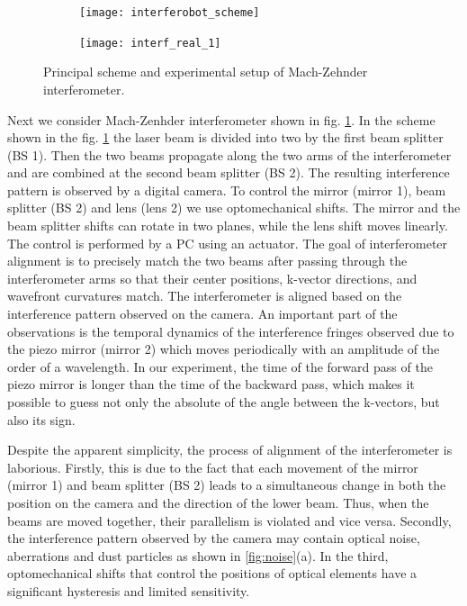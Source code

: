 \begin{figure}[ht]
    \centering
     \begin{subfigure}[b]{0.45\linewidth}
         \centering
         \texttt{[image: interferobot\_scheme]}
     \end{subfigure}
     \centering
     \begin{subfigure}[b]{0.45\linewidth}
         \centering
         \texttt{[image: interf\_real\_1]}
     \end{subfigure}
    \caption{
     Principal scheme and experimental setup of Mach-Zehnder interferometer.}
\label{fig:interf_scheme_1}
\end{figure}

Next we consider Mach-Zenhder interferometer shown in fig. \ref{fig:interf_scheme_1}. In the scheme shown in the fig. \ref{fig:interf_scheme_1} the laser beam is divided into two by the first beam splitter (BS 1). Then the two beams propagate along the two arms of the interferometer and are combined at the second beam splitter (BS 2). The resulting interference pattern is observed by a digital camera. To control the mirror (mirror 1), beam splitter (BS 2) and lens (lens 2) we use optomechanical shifts. The mirror and the beam splitter shifts can rotate in two planes, while the lens shift moves linearly. The control is performed by a PC using an actuator. The goal of interferometer alignment is to precisely match the two beams after passing through the interferometer arms so that their center positions, k-vector directions, and wavefront curvatures match. The interferometer is aligned based on the interference pattern observed on the camera. An important part of the observations is the temporal dynamics of the interference fringes observed due to the piezo mirror (mirror 2) which moves periodically with an amplitude of the order of a wavelength. In our experiment, the time of the forward pass of the piezo mirror is longer than the time of the backward pass, which makes it possible to guess not only the absolute of the angle between the k-vectors, but also its sign.

Despite the apparent simplicity, the process of alignment of the interferometer is laborious. Firstly, this is due to the fact that each movement of the mirror (mirror 1) and beam splitter (BS 2) leads to a simultaneous change in both the position on the camera and the direction of the lower beam. Thus, when the beams are moved together, their parallelism is violated and vice versa. Secondly, the interference pattern observed by the camera may contain optical noise, aberrations and dust particles as shown in \ref{fig:noise}(a). In the third, optomechanical shifts that control the positions of optical elements have a significant hysteresis and limited sensitivity.

